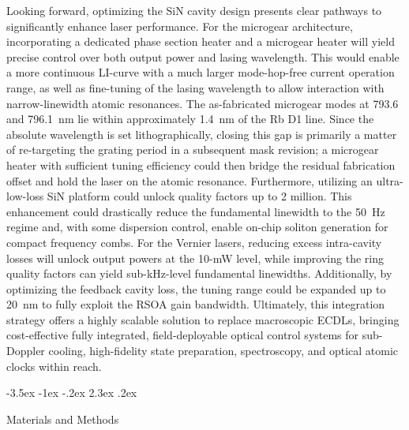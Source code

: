 \documentclass[%
 reprint,
 amsmath,amssymb,
 aps,
]{revtex4-2}
\makeatletter
\renewcommand\section{\@startsection {section}{1}{0pt}%
  {-3.5ex \@plus -1ex \@minus -.2ex}%
  {2.3ex \@plus.2ex}%
  {\normalfont\normalsize\bfseries\raggedright}}
\makeatother
\begin{document}
Looking forward, optimizing the SiN cavity design presents clear pathways to significantly enhance laser performance. For the microgear architecture, incorporating a dedicated phase section heater and a microgear heater will yield precise control over both output power and lasing wavelength. This would enable a more continuous LI-curve with a much larger mode-hop-free current operation range, as well as fine-tuning of the lasing wavelength to allow interaction with narrow-linewidth atomic resonances. The as-fabricated microgear modes at 793.6 and 796.1~nm lie within approximately 1.4~nm of the Rb D1 line. Since the absolute wavelength is set lithographically, closing this gap is primarily a matter of re-targeting the grating period in a subsequent mask revision; a microgear heater with sufficient tuning efficiency could then bridge the residual fabrication offset and hold the laser on the atomic resonance. Furthermore, utilizing an ultra-low-loss SiN platform could unlock quality factors up to 2 million. This enhancement could drastically reduce the fundamental linewidth to the 50~Hz regime and, with some dispersion control, enable on-chip soliton generation for compact frequency combs. For the Vernier lasers, reducing excess intra-cavity losses will unlock output powers at the 10-mW level, while improving the ring quality factors can yield sub-kHz-level fundamental linewidths. Additionally, by optimizing the feedback cavity loss, the tuning range could be expanded up to 20~nm to fully exploit the RSOA gain bandwidth. Ultimately, this integration strategy offers a highly scalable solution to replace macroscopic ECDLs, bringing cost-effective fully integrated, field-deployable optical control systems for sub-Doppler cooling, high-fidelity state preparation, spectroscopy, and optical atomic clocks within reach.

\section{Materials and Methods}
\end{document}
